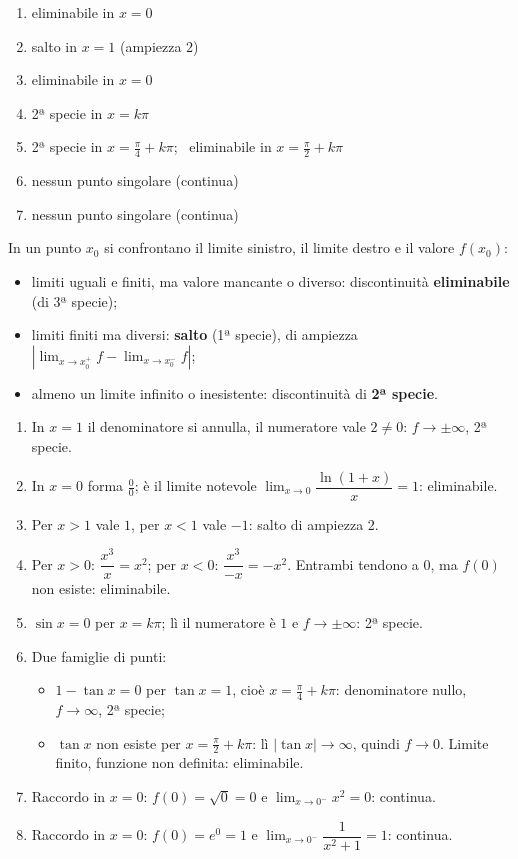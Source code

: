 \begin{question}[ID=2.2, subtitle={Punti singolari — serie 2}, tags={continuità, punti singolari}, difficulty=media]
\begin{solution}
\begin{enumerate}[label=\arabic*)]
    \item eliminabile in $x=0$
    \item salto in $x=1$ (ampiezza $2$)
    \item eliminabile in $x=0$
    \item 2ª specie in $x=k\pi$
    \item 2ª specie in $x=\tfrac\pi4+k\pi$; \ eliminabile in $x=\tfrac\pi2+k\pi$
    \item nessun punto singolare (continua)
    \item nessun punto singolare (continua)
\end{enumerate}
\end{solution}
\begin{explanation}
In un punto $x_0$ si confrontano il limite sinistro, il limite destro e il valore $f(x_0)$:
\begin{itemize}
    \item limiti uguali e finiti, ma valore mancante o diverso: discontinuità \textbf{eliminabile} (di 3ª specie);
    \item limiti finiti ma diversi: \textbf{salto} (1ª specie), di ampiezza $|\lim_{x\to x_0^+}f-\lim_{x\to x_0^-}f|$;
    \item almeno un limite infinito o inesistente: discontinuità di \textbf{2ª specie}.
\end{itemize}
\begin{enumerate}[label=\arabic*)]
    \item In $x=1$ il denominatore si annulla, il numeratore vale $2\neq0$: $f\to\pm\infty$, 2ª specie.
    \item In $x=0$ forma $\tfrac00$; è il limite notevole $\displaystyle\lim_{x\to0}\dfrac{\ln(1+x)}{x}=1$: eliminabile.
    \item Per $x>1$ vale $1$, per $x<1$ vale $-1$: salto di ampiezza $2$.
    \item Per $x>0$: $\dfrac{x^3}{x}=x^2$; per $x<0$: $\dfrac{x^3}{-x}=-x^2$. Entrambi tendono a $0$, ma $f(0)$ non esiste: eliminabile.
    \item $\sin x=0$ per $x=k\pi$; lì il numeratore è $1$ e $f\to\pm\infty$: 2ª specie.
    \item Due famiglie di punti:
    \begin{itemize}
        \item $1-\tan x=0$ per $\tan x=1$, cioè $x=\tfrac\pi4+k\pi$: denominatore nullo, $f\to\infty$, 2ª specie;
        \item $\tan x$ non esiste per $x=\tfrac\pi2+k\pi$: lì $|\tan x|\to\infty$, quindi $f\to0$. Limite finito, funzione non definita: eliminabile.
    \end{itemize}
    \item Raccordo in $x=0$: $f(0)=\sqrt0=0$ e $\displaystyle\lim_{x\to0^-}x^2=0$: continua.
    \item Raccordo in $x=0$: $f(0)=e^0=1$ e $\displaystyle\lim_{x\to0^-}\dfrac{1}{x^2+1}=1$: continua.
\end{enumerate}
\end{explanation}
\end{question}

